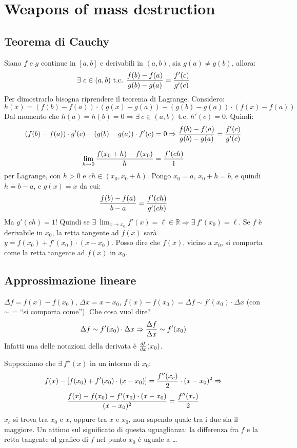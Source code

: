 \documentclass[12pt,a4paper]{article}
\begin{document}
\newpage
\section{Weapons of mass destruction}

\subsection{Teorema di Cauchy}
Siano $f$ e $g$ continue in $[a,b]$ e derivabili in $(a,b)$, sia $g(a) \neq
g(b)$, allora:
$$
\exists \ c \in (a,b) \text{ t.c. } {f(b) - f(a) \over g(b) - g(a)} = 
{f'(c) \over g'(c)}
$$
Per dimostrarlo bisogna riprendere il teorema di Lagrange. Considero:
$$
h(x) = \left( f(b) - f(a) \right) \cdot \left( g(x) - g(a) \right) -
\left( g(b) - g(a) \right) \cdot \left( f(x) - f(a) \right)
$$
Dal momento che $h(a) = h(b) = 0 \Rightarrow \exists \ c \in (a,b)$
t.c. $h'(c) = 0$. Quindi:
$$
\left(f(b) - f(a) \right) \cdot g'(c) - \left( g(b) - g(a) \right) \cdot
f'(c) = 0 \Rightarrow
{f(b) - f(a) \over g(b) - g(a)} = {f'(c) \over g'(c)}
$$

$$
\lim_{h \to 0} {f(x_0 +h) - f(x_0) \over h} = {f'(ch) \over 1}
$$
per Lagrange, con $h>0$ e $ch \in (x_0, x_0+h)$. Pongo $x_0 = a$, $x_0+h =
b$, e quindi $h = b - a$, e $g(x) = x$ da cui:
$$
{f(b) - f(a) \over b - a} = {f'(ch) \over g'(ch)}
$$
Ma $g'(ch) = 1$! Quindi se $\exists \ \lim_{x \to x_0} f'(x) = \ell \in
\mathbb{R} \Rightarrow \exists \ f'(x_0) = \ell$. Se $f$ \`e derivabile in 
$x_0$, la retta tangente ad $f(x)$ sar\`a $y = f(x_0) + f'(x_0) \cdot
(x - x_0)$. Posso dire che $f(x)$, vicino a $x_0$, si comporta come la
retta tangente ad $f(x)$ in $x_0$.

\subsection{Approssimazione lineare}
$\Delta f = f(x) - f(x_0)$, $\Delta x = x - x_0$, $f(x) - f(x_0) = \Delta
f \sim f'(x_0) \cdot \Delta x$ (con $\sim$ = ``si comporta come''). Che
cosa vuol dire?
$$
\Delta f \sim f'(x_0) \cdot \Delta x \Rightarrow 
{\Delta f \over \Delta x} \sim f'(x_0)
$$
Infatti una delle notazioni della derivata \`e ${df \over dx}(x_0)$.

Supponiamo che $\exists \ f''(x)$ in un intorno di $x_0$:
$$
f(x) - \left[ f(x_0) + f'(x_0) \cdot (x-x_0) \right] = 
{f''(x_c) \over 2} \cdot (x - x_0)^2 \Rightarrow
$$
$$
{f(x) - f(x_0) - f'(x_0) \cdot (x - x_0) \over (x - x_0)^2} = 
{f''(x_c) \over 2}
$$
$x_c$ si trova tra $x_0$ e $x$, oppure tra $x$ e $x_0$, non sapendo
quale tra i due sia il maggiore. Un attimo sul significato di questa
uguaglianza: la differenza fra $f$ e la retta tangente al grafico di
$f$ nel punto $x_0$ \`e uguale a \dots
\end{document}
